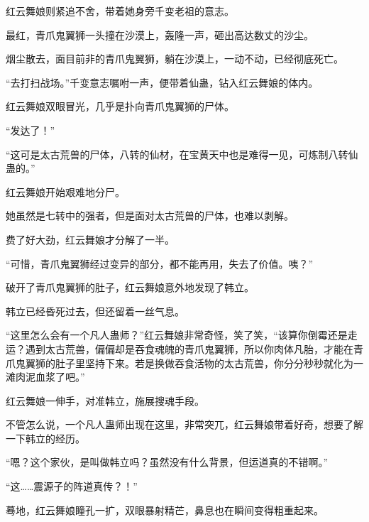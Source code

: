 \begin{this_body}
红云舞娘则紧追不舍，带着她身旁千变老祖的意志。

最红，青爪鬼翼狮一头撞在沙漠上，轰隆一声，砸出高达数丈的沙尘。

烟尘散去，面目前非的青爪鬼翼狮，躺在沙漠上，一动不动，已经彻底死亡。

“去打扫战场。”千变意志嘱咐一声，便带着仙蛊，钻入红云舞娘的体内。

红云舞娘双眼冒光，几乎是扑向青爪鬼翼狮的尸体。

“发达了！”

“这可是太古荒兽的尸体，八转的仙材，在宝黄天中也是难得一见，可炼制八转仙蛊的。”

红云舞娘开始艰难地分尸。

她虽然是七转中的强者，但是面对太古荒兽的尸体，也难以剥解。

费了好大劲，红云舞娘才分解了一半。

“可惜，青爪鬼翼狮经过变异的部分，都不能再用，失去了价值。咦？”

破开了青爪鬼翼狮的肚子，红云舞娘意外地发现了韩立。

韩立已经昏死过去，但还留着一丝气息。

“这里怎么会有一个凡人蛊师？”红云舞娘非常奇怪，笑了笑，“该算你倒霉还是走运？遇到太古荒兽，偏偏却是吞食魂魄的青爪鬼翼狮，所以你肉体凡胎，才能在青爪鬼翼狮的肚子里坚持下来。若是换做吞食活物的太古荒兽，你分分秒秒就化为一滩肉泥血浆了吧。”

红云舞娘一伸手，对准韩立，施展搜魂手段。

不管怎么说，一个凡人蛊师出现在这里，非常突兀，红云舞娘带着好奇，想要了解一下韩立的经历。

“嗯？这个家伙，是叫做韩立吗？虽然没有什么背景，但运道真的不错啊。”

“这……震源子的阵道真传？！”

蓦地，红云舞娘瞳孔一扩，双眼暴射精芒，鼻息也在瞬间变得粗重起来。

\end{this_body}

